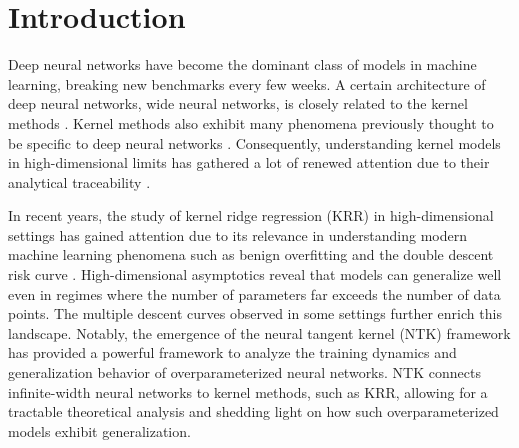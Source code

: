 \documentclass[twoside,11pt]{article}
\newcommand{\1}{\mathbf{1}}
\begin{document}
\section{Introduction}
Deep neural networks have become the dominant class of models in machine learning, breaking new benchmarks every few weeks. A certain architecture of deep neural networks, wide neural networks, is closely related to the kernel methods \citep{jacot2018neural}. Kernel methods \citep{scholkopf2002learning,williams2006gaussian} also exhibit many phenomena previously thought to be specific to deep neural networks \citep{belkin2018understand}.
Consequently, understanding kernel models in high-dimensional limits has gathered a lot of renewed attention due to their analytical traceability \citep{radhakrishnan2024mechanism}. 

In recent years, the study of kernel ridge regression (KRR) in high-dimensional settings has gained attention due to its relevance in understanding modern machine learning phenomena such as benign overfitting \citep{bartlett2020benign,tsigler2023benign,bartlett2021deep} and the double descent risk curve \citep{belkin2019reconciling,mei2019generalization}. High-dimensional asymptotics reveal that models can generalize well even in regimes where the number of parameters far exceeds the number of data points.  The multiple descent curves \citep{liang2020multiple} observed in some settings further enrich this landscape. Notably, the emergence of the neural tangent kernel (NTK) framework \citep{jacot2018neural} has provided a powerful framework to analyze the training dynamics and generalization behavior of overparameterized neural networks. NTK connects infinite-width neural networks to kernel methods, such as KRR, allowing for a tractable theoretical analysis and shedding light on how such overparameterized models exhibit generalization.
\end{document}
